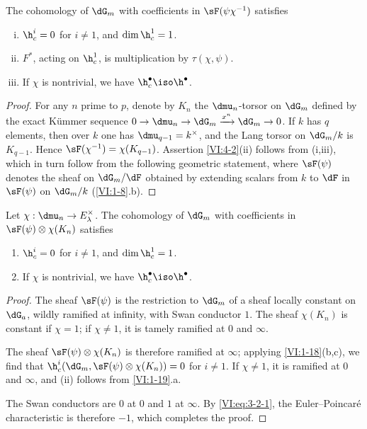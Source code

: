 \documentclass[oneside]{book}
\begin{document}
\begin{proposition_}\label{VI:4-2}
The cohomology of $\dG_m$ with coefficients in $\sF(\psi\chi^{-1})$ satisfies 
\begin{enumerate}[(i)]
  \item $\h_c^i=0$ for $i\ne 1$, and $\dim \h_c^1=1$. 
  \item $F^\ast$, acting on $\h_c^1$, is multiplication by 
    $\tau(\chi,\psi)$. 
  \item If $\chi$ is nontrivial, we have $\h_c^\bullet \iso \h^\bullet$. 
\end{enumerate}
\end{proposition_}
\begin{proof}[Proof]
For any $n$ prime to $p$, denote by $K_n$ the $\dmu_n$-torsor on $\dG_m$ 
defined by the exact K\"ummer sequence 
$0 \to \dmu_n \to \dG_m \xrightarrow{x^n} \dG_m \to 0$. If $k$ has $q$ 
elements, then over $k$ one has $\dmu_{q-1}=k^\times$, and the Lang torsor on 
$\dG_m/k$ is $K_{q-1}$. Hence $\sF(\chi^{-1})=\chi(K_{q-1})$. 
Assertion \ref{VI:4-2}(ii) follows from (i,iii), which in turn follow from 
the following geometric statement, where $\sF(\psi)$ denotes the sheaf 
on $\dG_m/\dF$ obtained by extending scalars from $k$ to $\dF$ in 
$\sF(\psi)$ on $\dG_m/k$ (\ref{VI:1-8}.b). 
\end{proof}





\begin{proposition_}\label{VI:4-3}
Let $\chi:\dmu_n \to E_\lambda^\times$. The cohomology of $\dG_m$ with 
coefficients in $\sF(\psi)\otimes \chi(K_n)$ satisfies 
\begin{enumerate}[\indent (i)]
  \item $\h_c^i=0$ for $i\ne 1$, and $\dim \h_c^1{} = 1$. 
  \item If $\chi$ is nontrivial, we have $\h_c^\bullet{}\iso \h^\bullet{}$. 
\end{enumerate}
\end{proposition_}
\begin{proof}[Proof]
The sheaf $\sF(\psi)$ is the restriction to $\dG_m$ of a sheaf locally 
constant on $\dG_a$, wildly ramified at infinity, with Swan conductor 
$1$. The sheaf $\chi(K_n)$ is constant if $\chi=1$; if $\chi\ne 1$, it 
is tamely ramified at $0$ and $\infty$. 

The sheaf $\sF(\psi)\otimes\chi(K_n)$ is therefore ramified at $\infty$; 
applying \ref{VI:1-18}(b,c), we find that 
$\h_c^i(\dG_m,\sF(\psi)\otimes \chi(K_n))=0$ for $i\ne 1$. If $\chi\ne 1$, it 
is ramified at $0$ and $\infty$, and (ii) follows from \ref{VI:1-19}.a. 

The Swan conductors are $0$ at $0$ and $1$ at $\infty$. By 
\eqref{VI:eq:3-2-1}, the Euler--Poincaré characteristic is therefore $-1$, 
which completes the proof. 
\end{proof}
\end{document}
